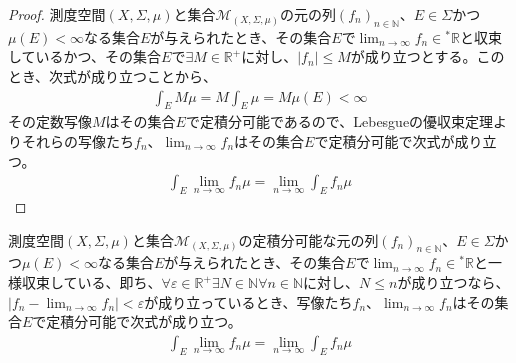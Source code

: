 \documentclass[dvipdfmx]{jsarticle}
\begin{document}
\begin{proof}
測度空間$(X,\varSigma,\mu)$と集合$\mathcal{M}_{(X,\varSigma,\mu)}$の元の列$\left( f_{n} \right)_{n \in \mathbb{N}}$、$E \in \varSigma$かつ$\mu(E) < \infty$なる集合$E$が与えられたとき、その集合$E$で$\lim_{n \rightarrow \infty}f_{n} \in{}^{*}\mathbb{R}$と収束しているかつ、その集合$E$で$\exists M \in \mathbb{R}^{+}$に対し、$\left| f_{n} \right| \leq M$が成り立つとする。このとき、次式が成り立つことから、
\begin{align*}
\int_{E} {M\mu} = M\int_{E} \mu = M\mu(E) < \infty
\end{align*}
その定数写像$M$はその集合$E$で定積分可能であるので、Lebesgueの優収束定理よりそれらの写像たち$f_{n}$、$\lim_{n \rightarrow \infty}f_{n}$はその集合$E$で定積分可能で次式が成り立つ。
\begin{align*}
\int_{E} {\lim_{n \rightarrow \infty}f_{n}\mu} = \lim_{n \rightarrow \infty}{\int_{E} {f_{n}\mu}}
\end{align*}
\end{proof}
\begin{thm}\label{4.6.2.8}
測度空間$(X,\varSigma,\mu)$と集合$\mathcal{M}_{(X,\varSigma,\mu)}$の定積分可能な元の列$\left( f_{n} \right)_{n \in \mathbb{N}}$、$E \in \varSigma$かつ$\mu(E) < \infty$なる集合$E$が与えられたとき、その集合$E$で$\lim_{n \rightarrow \infty}f_{n} \in{}^{*}\mathbb{R}$と一様収束している、即ち、$\forall\varepsilon \in \mathbb{R}^{+}\exists N \in \mathbb{N}\forall n \in \mathbb{N}$に対し、$N \leq n$が成り立つなら、$\left| f_{n} - \lim_{n \rightarrow \infty}f_{n} \right| < \varepsilon$が成り立っているとき、写像たち$f_{n}$、$\lim_{n \rightarrow \infty}f_{n}$はその集合$E$で定積分可能で次式が成り立つ。
\begin{align*}
\int_{E} {\lim_{n \rightarrow \infty}f_{n}\mu} = \lim_{n \rightarrow \infty}{\int_{E} {f_{n}\mu}}
\end{align*}
\end{thm}
\end{document}
